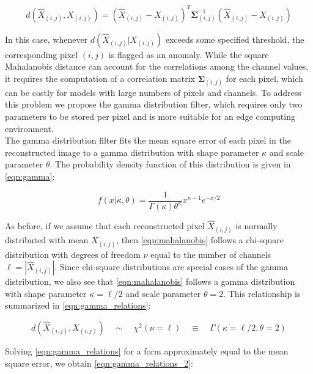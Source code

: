 \documentclass[12pt]{article}
\begin{document}
\begin{equation}
d(\hat{X}_{(i,j)}, X_{(i,j)}) = (\hat{X}_{(i,j)} - X_{(i,j)})^T\mathbf{\Sigma}^{-1}_{(i,j)}(\hat{X}_{(i,j)} - X_{(i,j)})
\label{eqn:mahalanobis}
\end{equation}

In this case, whenever $d(\hat{X}_{(i,j)} | X_{(i,j)})$ exceeds some specified threshold, the corresponding pixel $(i,j)$ is flagged as an anomaly. While the square Mahalanobis distance can account for the correlations among the channel values, it requires the computation of a correlation matrix $\mathbf{\Sigma}_{(i,j)}$ for each pixel, which can be costly for models with large numbers of pixels and channels. To address this problem we propose the gamma distribution filter, which requires only two parameters to be stored per pixel and is more suitable for an edge computing environment.\\

The gamma distribution filter fits the mean square error of each pixel in the reconstructed image to a gamma distribution with shape parameter $\kappa$ and scale parameter $\theta$. The probability density function of this distribution is given in \eqref{eqn:gamma}:

\begin{equation}
f(x|\kappa,\theta) = \frac{1}{\Gamma(\kappa)\theta^\kappa}x^{\kappa - 1}e^{-x / 2}
\label{eqn:gamma}
\end{equation}

As before, if we assume that each reconstructed pixel $\hat{X}_{(i,j)}$ is normally distributed with mean $X_{(i,j)}$, then \eqref{eqn:mahalanobis} follows a chi-square distribution with degrees of freedom $\nu$ equal to the number of channels $\ell = |\hat{X}_{(i,j)}|$. Since chi-square distributions are special cases of the gamma distribution, we also see that \eqref{eqn:mahalanobis} follows a gamma distribution with shape parameter $\kappa = \ell/2$ and scale parameter $\theta = 2$. This relationship is summarized in \eqref{eqn:gamma_relations}:

\begin{equation}
d(\hat{X}_{(i,j)}, X_{(i,j)})\quad \sim\quad \chi^{2}(\nu = \ell)\quad \equiv \quad \Gamma(\kappa = \ell/2, \theta = 2)
\label{eqn:gamma_relations}
\end{equation}

\noindent Solving \eqref{eqn:gamma_relations} for a form approximately equal to the mean square error, we obtain \eqref{eqn:gamma_relations_2}:
\end{document}
